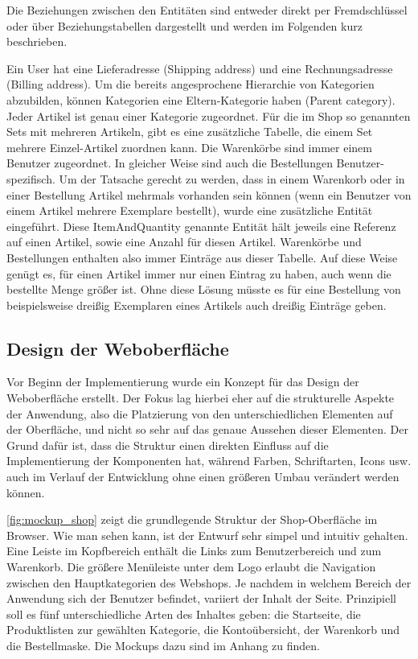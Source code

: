 Die Beziehungen zwischen den Entitäten sind entweder direkt per Fremdschlüssel oder über Beziehungstabellen dargestellt und werden im Folgenden kurz beschrieben.

Ein User hat eine Lieferadresse (Shipping address) und eine Rechnungsadresse (Billing address).
Um die bereits angesprochene Hierarchie von Kategorien abzubilden, können Kategorien eine Eltern-Kategorie haben (Parent category).
Jeder Artikel ist genau einer Kategorie zugeordnet. Für die im Shop so genannten Sets mit mehreren Artikeln, gibt es eine zusätzliche Tabelle, die einem Set mehrere Einzel-Artikel zuordnen kann.
Die Warenkörbe sind immer einem Benutzer zugeordnet. In gleicher Weise sind auch die Bestellungen Benutzer-spezifisch.
Um der Tatsache gerecht zu werden, dass in einem Warenkorb oder in einer Bestellung Artikel mehrmals vorhanden sein können (wenn ein Benutzer von einem Artikel mehrere Exemplare bestellt), wurde eine zusätzliche Entität eingeführt.
Diese ItemAndQuantity genannte Entität hält jeweils eine Referenz auf einen Artikel, sowie eine Anzahl für diesen Artikel.
Warenkörbe und Bestellungen enthalten also immer Einträge aus dieser Tabelle.
Auf diese Weise genügt es, für einen Artikel immer nur einen Eintrag zu haben, auch wenn die bestellte Menge größer ist.
Ohne diese Lösung müsste es für eine Bestellung von beispielsweise dreißig Exemplaren eines Artikels auch dreißig Einträge geben.

\subsection{Design der Weboberfläche}
Vor Beginn der Implementierung wurde ein Konzept für das Design der Weboberfläche erstellt. Der Fokus lag hierbei eher auf die strukturelle Aspekte der Anwendung, also die Platzierung von den unterschiedlichen Elementen auf der Oberfläche, und nicht so sehr auf das genaue Aussehen dieser Elementen. Der Grund dafür ist, dass die Struktur einen direkten Einfluss auf die Implementierung der Komponenten hat, während Farben, Schriftarten, Icons usw. auch im Verlauf der Entwicklung ohne einen größeren Umbau verändert werden können.

\cref{fig:mockup_shop} zeigt die grundlegende Struktur der Shop-Oberfläche im Browser. Wie man sehen kann, ist der Entwurf sehr simpel und intuitiv gehalten. Eine Leiste im Kopfbereich enthält die Links zum Benutzerbereich und zum Warenkorb. Die größere Menüleiste unter dem Logo erlaubt die Navigation zwischen den Hauptkategorien des Webshops. Je nachdem in welchem Bereich der Anwendung sich der Benutzer befindet, variiert der Inhalt der Seite. Prinzipiell soll es fünf unterschiedliche Arten des Inhaltes geben: die Startseite, die Produktlisten zur gewählten Kategorie, die Kontoübersicht, der Warenkorb und die Bestellmaske. Die Mockups dazu sind im Anhang zu finden. %

